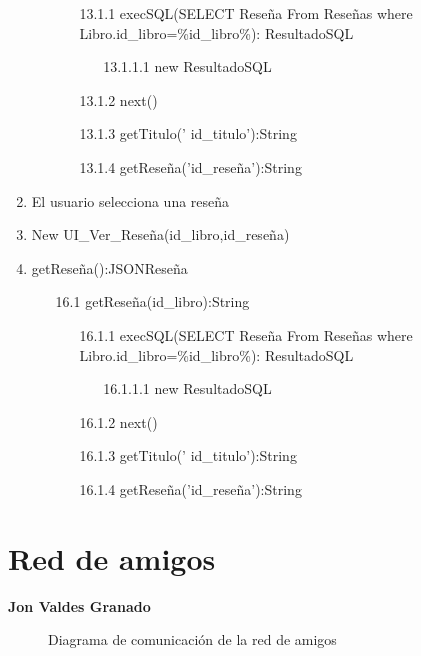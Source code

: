 ﻿\documentclass{report}
\begin{document}
\begin{enumerate}
\begin{enumerate}
                \begin{enumerate}
                    \item [13.1.1] execSQL(SELECT Reseña From Reseñas where Libro.id\_libro=\%id\_libro\%): ResultadoSQL     
                    \begin{enumerate}
                        \item [13.1.1.1] new ResultadoSQL
                    \end{enumerate}               
                    \item [13.1.2] next()
                    \item [13.1.3] getTitulo(’ id\_titulo’):String
                    \item [13.1.4] getReseña('id\_reseña'):String
                \end{enumerate}
            \end{enumerate}
            \item El usuario selecciona una reseña 
            \item New UI\_Ver\_Reseña(id\_libro,id\_reseña)
            \item getReseña():JSONReseña
            \begin{enumerate}
                \item [16.1] getReseña(id\_libro):String
                \begin{enumerate}
                    \item [16.1.1] execSQL(SELECT Reseña From Reseñas where Libro.id\_libro=\%id\_libro\%): ResultadoSQL     
                    \begin{enumerate}
                        \item [16.1.1.1] new ResultadoSQL
                    \end{enumerate}               
                    \item [16.1.2] next()
                    \item [16.1.3] getTitulo(’ id\_titulo’):String
                    \item [16.1.4] getReseña('id\_reseña'):String
                \end{enumerate}
            \end{enumerate}
         
            
            

        \end{enumerate}
        \clearpage
        \section{Red de amigos}
            \textbf{Jon Valdes Granado}
            \begin{figure}[H]
                \centering
                \caption{Diagrama de comunicación de la red de amigos}
            \end{figure}
            \clearpage
\end{document}
